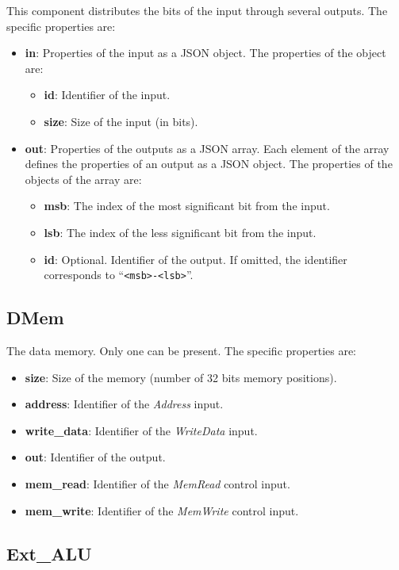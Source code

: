 \documentclass[11pt,a4paper,twoside,titlepage]{report}
\begin{document}
This component distributes the bits of the input through several outputs.
The specific properties are:
\begin{itemize}
	\item \textbf{in}: Properties of the input as a JSON object.
		The properties of the object are:
		\begin{itemize}
			\item \textbf{id}: Identifier of the input.
			\item \textbf{size}: Size of the input (in bits).
		\end{itemize}
	\item \textbf{out}: Properties of the outputs as a JSON array.
		Each element of the array defines the properties of an output as a
		JSON object. The properties of the objects of the array are:
		\begin{itemize}
			\item \textbf{msb}: The index of the most significant bit from the input.
			\item \textbf{lsb}: The index of the less significant bit from the input.
			\item \textbf{id}: Optional. Identifier of the output. If omitted,
				the identifier corresponds to ``\verb+<msb>-<lsb>+''.
		\end{itemize}
\end{itemize}

\subsection{DMem}

The data memory. Only one can be present. The specific properties are:
\begin{itemize}
	\item \textbf{size}: Size of the memory (number of 32 bits memory positions).
	\item \textbf{address}: Identifier of the \emph{Address} input.
	\item \textbf{write\_data}: Identifier of the \emph{WriteData} input.
	\item \textbf{out}: Identifier of the output.
	\item \textbf{mem\_read}: Identifier of the \emph{MemRead} control input.
	\item \textbf{mem\_write}: Identifier of the \emph{MemWrite} control input.
\end{itemize}

\subsection{Ext\_ALU}
\end{document}
